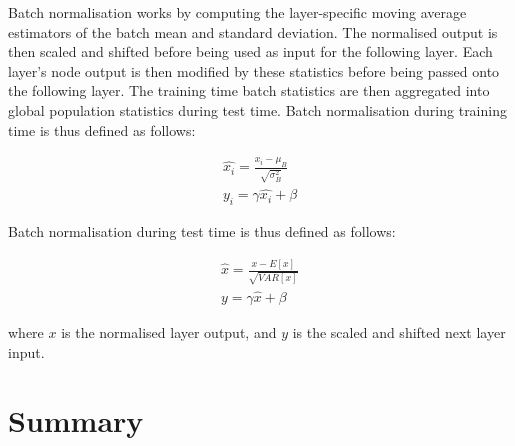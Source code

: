 Batch normalisation works by computing the layer-specific moving average estimators of the batch mean and standard deviation. The normalised output is then scaled and shifted before being used as input for the following layer. Each layer's node output is then modified by these statistics before being passed onto the following layer. The training time batch statistics are then aggregated into global population statistics during test time. \newline
Batch normalisation during training time is thus defined as follows:

\begin{subequations}
	\begin{gather}
		\hat{x_i} = \frac{x_i - \mu_B}{\sqrt{\sigma_B^2}} \\
		y_i = \gamma \hat{x_i} + \beta
	\end{gather}
\end{subequations}

Batch normalisation during test time is thus defined as follows:

\begin{subequations}
	\begin{gather}
		\hat{x} = \frac{x - E \left [ x \right ]}{\sqrt{VAR \left [ x \right ]}} \\
		y = \gamma \hat{x} + \beta
	\end{gather}
\end{subequations}

where $x$ is the normalised layer output, and $y$ is the scaled and shifted next layer input. 



\section{Summary}

